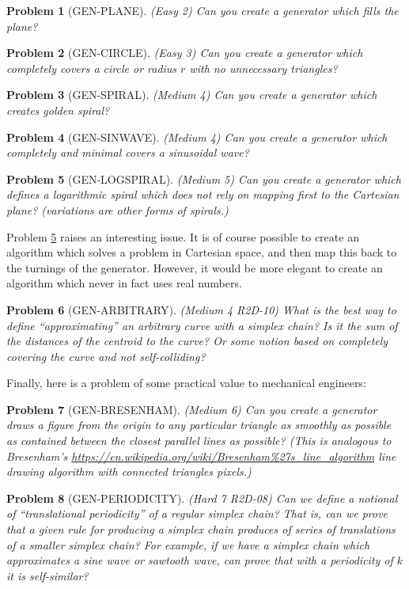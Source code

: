 \documentclass[11pt]{article}
\newtheorem{problem}{Problem}
\begin{document}
\begin{problem}[GEN-PLANE]
(Easy 2) Can you create a generator which fills the plane?  
\end{problem}
\begin{problem}[GEN-CIRCLE]
  (Easy 3) Can you create a generator which completely covers a circle or radius $r$ with no unnecessary triangles?
\end{problem}
\begin{problem}[GEN-SPIRAL]
  (Medium 4) Can you create a generator which creates golden spiral?
\end{problem}
\begin{problem}[GEN-SINWAVE]
  (Medium 4) Can you create a generator which completely and minimal covers a sinusoidal wave?
\end{problem}
\begin{problem}[GEN-LOGSPIRAL]
  \label{probgenlogspiral}
  (Medium 5) Can you create a generator which defines a logarithmic spiral which does not rely on mapping first to the Cartesian plane?
  (variations are other forms of spirals.)
\end{problem}
Problem \ref{probgenlogspiral} raises an interesting issue. It is of course possible to create an algorithm which solves a problem in Cartesian space, and then
map this back to the turnings of the generator. However, it would be more elegant to create an algorithm which never in fact uses real numbers.


\begin{problem}[GEN-ARBITRARY]
(Medium 4 R2D-10) What is the best way to define ``approximating'' an arbitrary  curve with a simplex chain? Is it the sum of the distances of the centroid to the curve?
  Or some notion based on completely covering the curve and not self-colliding?  
\end{problem}

Finally, here is a problem of some practical value to mechanical engineers:
\begin{problem}[GEN-BRESENHAM]
  (Medium 6) Can you create a generator draws a figure from the origin to any particular triangle as smoothly as possible as contained
  between the closest parallel lines as possible? (This is analogous to Bresenham's \url{https://en.wikipedia.org/wiki/Bresenham%27s_line_algorithm}
    line drawing algorithm with connected triangles pixels.)
\end{problem}

\begin{problem}[GEN-PERIODICITY]
(Hard 7 R2D-08) Can we define a notional of ``translational periodicity'' of a regular simplex chain? That is, can we prove that
  a given rule for producing a simplex chain produces of series of translations of a smaller simplex chain? For example,
  if we have a simplex chain which approximates a sine wave or sawtooth wave, can prove that with a periodicity of $k$ it
  is self-similar?  
\end{problem}
\end{document}
